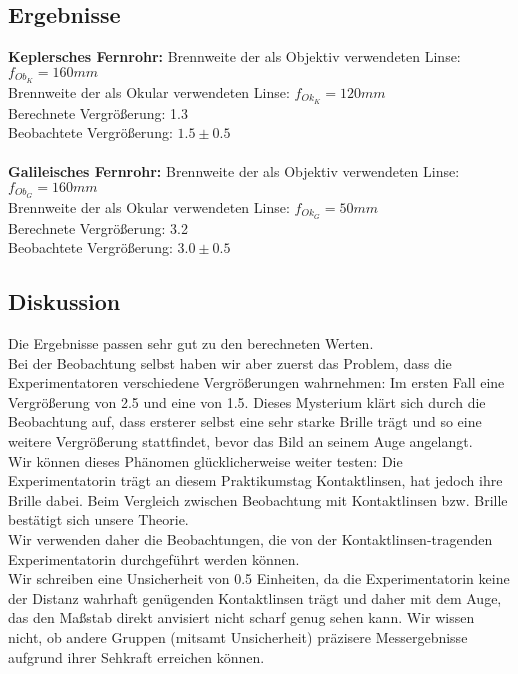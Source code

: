 \documentclass{article}
\begin{document}
\subsection{Ergebnisse}
\textbf{Keplersches Fernrohr:}
Brennweite der als Objektiv verwendeten Linse: $f_{Ob_K}=160mm$\\
Brennweite der als Okular verwendeten Linse: $f_{Ok_K}=120mm$\\
Berechnete Vergrößerung: 1.3\\
Beobachtete Vergrößerung: $1.5 \pm 0.5$\\
\\
\textbf{Galileisches Fernrohr:}
Brennweite der als Objektiv verwendeten Linse: $f_{Ob_G}=160mm$\\
Brennweite der als Okular verwendeten Linse: $f_{Ok_G}=50mm$\\
Berechnete Vergrößerung: 3.2\\
Beobachtete Vergrößerung: $3.0 \pm 0.5$\\

\subsection{Diskussion}
Die Ergebnisse passen sehr gut zu den berechneten Werten.\\
Bei der Beobachtung selbst haben wir aber zuerst das Problem, dass die Experimentatoren verschiedene Vergrößerungen wahrnehmen: Im ersten Fall eine Vergrößerung von 2.5 und eine von 1.5. Dieses Mysterium klärt sich durch die Beobachtung auf, dass ersterer selbst eine sehr starke Brille trägt und so eine weitere Vergrößerung stattfindet, bevor das Bild an seinem Auge angelangt.\\
Wir können dieses Phänomen glücklicherweise weiter testen: Die Experimentatorin trägt an diesem Praktikumstag Kontaktlinsen, hat jedoch ihre Brille dabei. Beim Vergleich zwischen Beobachtung mit Kontaktlinsen bzw. Brille bestätigt sich unsere Theorie.\\
Wir verwenden daher die Beobachtungen, die von der Kontaktlinsen-tragenden Experimentatorin durchgeführt werden können.\\
Wir schreiben eine Unsicherheit von 0.5 Einheiten, da die Experimentatorin keine der Distanz wahrhaft genügenden Kontaktlinsen trägt und daher mit dem Auge, das den Maßstab direkt anvisiert nicht scharf genug sehen kann. Wir wissen nicht, ob andere Gruppen (mitsamt Unsicherheit) präzisere Messergebnisse aufgrund ihrer Sehkraft erreichen können.
\end{document}
